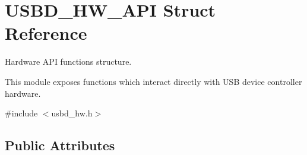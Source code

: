 \hypertarget{struct_u_s_b_d___h_w___a_p_i}{}\section{U\+S\+B\+D\+\_\+\+H\+W\+\_\+\+A\+PI Struct Reference}
\label{struct_u_s_b_d___h_w___a_p_i}


Hardware A\+PI functions structure.

This module exposes functions which interact directly with U\+SB device controller hardware.  




{\ttfamily \#include $<$usbd\+\_\+hw.\+h$>$}

\subsection*{Public Attributes}
